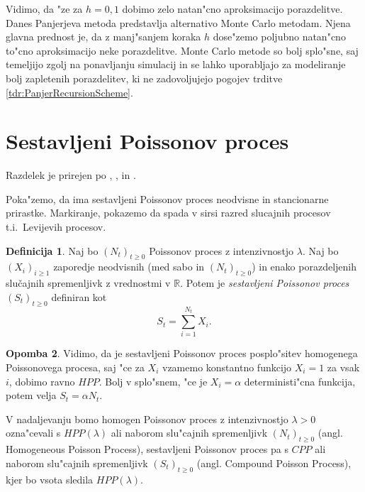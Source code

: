 \documentclass[12pt, a4paper, reqno]{amsart}
\theoremstyle{definition}
\newtheorem{definicija}{Definicija}[section]
\newtheorem{opomba}[definicija]{Opomba}
\theoremstyle{plain}
\newcommand{\1}{\mathds{1}}
\begin{document}
    Vidimo, da "ze za $h = 0,1$ dobimo zelo natan"cno aproksimacijo porazdelitve. Danes 
    Panjerjeva metoda predstavlja alternativo Monte Carlo metodam. Njena glavna prednost 
    je, da z manj"sanjem koraka $h$ dose"zemo poljubno natan"cno to"cno aproksimacijo neke porazdelitve. 
    Monte Carlo metode so bolj splo"sne, saj temeljijo zgolj na ponavljanju simulacij in se lahko uporabljajo za modeliranje bolj zapletenih 
    porazdelitev, ki ne zadovoljujejo pogojev trditve \ref{tdr:PanjerRecursionScheme}.

\pagebreak
\section{Sestavljeni Poissonov proces}

    \noindent
    Razdelek je prirejen po \cite{1}, \cite{2}, in \cite{3}.

    Poka"zemo, da ima sestavljeni Poissonov proces neodvisne in stancionarne prirastke. Markiranje, pokazemo 
    da spada v sirsi razred slucajnih procesov t.i.\ Levijevih procesov.


    \begin{definicija}
        Naj bo $(N_t)_{t\geq0}$ Poissonov proces z intenzivnostjo $\lambda$. 
        Naj bo $(X_i)_{i\geq1}$ zaporedje neodvisnih (med sabo in $(N_t)_{t\geq0}$) in enako 
        porazdeljenih slučajnih spremenljivk z vrednostmi v $\mathbb{R}$. Potem je 
        \textit{sestavljeni Poissonov proces} $(S_t)_{t\geq0}$ definiran kot
        $$
            S_t = \sum_{i=1}^{N_t} X_i.
        $$
        \label{def:CPP}
    \end{definicija}

    \begin{opomba}
        Vidimo, da je sestavljeni Poissonov proces posplo"sitev homogenega Poissonovega procesa, saj "ce za
        $X_i$ vzamemo konstantno funkcijo $X_i = 1$ za vsak $i$, dobimo ravno $HPP$. Bolj v splo"snem, "ce je 
        $X_i = \alpha$ deterministi"cna funkcija, potem velja $S_t = \alpha N_t$.
        \label{op:CPPHPPPovezava}
    \end{opomba}

    V nadaljevanju bomo homogen Poissonov proces z intenzivnostjo $\lambda >0$ ozna"cevali s $HPP(\lambda)$ 
    ali naborom slu"cajnih spremenljivk $(N_t)_{t\geq0}$ (angl. Homogeneous Poisson Process), 
    sestavljeni Poissonov proces pa s $CPP$ ali naborom slu"cajnih spremenljivk $(S_t)_{t\geq0}$ 
    (angl. Compound Poisson Process), kjer bo vsota sledila $HPP(\lambda)$.
\end{document}
